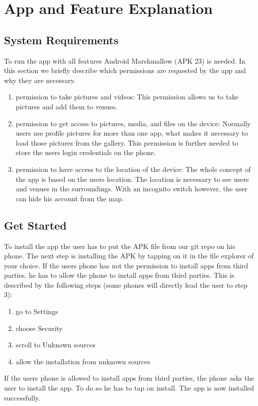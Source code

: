 \documentclass[11pt, accentcolor=tud1c]{tudreport}
\begin{document}


\chapter{App and Feature Explanation}\label{ch:app_and_feature_explanation}

\section{System Requirements}\label{sec:system_requirements}
To run the app with all features Android Marshmallow (APK 23) is needed. 
In this section we briefly describe which permissions are requested by the app and why they are necessary.
\begin{enumerate}
\item permission to take pictures and videos: This permission allows us to take pictures and add them to venues.
\item permission to get access to pictures, media, and files on the device: Normally users use profile pictures for more than one app, what makes it necessary to load those pictures from the gallery. This permission is further needed to store the users login credentials on the phone.
\item permission to have access to the location of the device: The whole concept of the app is based on the users location. The location is necessary to see users and venues in the surroundings. With an incognito switch however, the user can hide his account from the map.
\end{enumerate}

\section{Get Started}
To install the app the user has to put the APK file from our git repo on his phone. The next step is installing the APK by tapping on it in the file explorer of your choice. If the users phone has not the permission to install apps from third parties, he has to allow the phone to install apps from third parties. This is described by the following steps (some phones will directly lead the user to step 3):
\begin{enumerate}
\item go to Settings
\item choose Security
\item scroll to Unknown sources
\item allow the installation from unknown sources
\end{enumerate} 
If the users phone is allowed to install apps from third parties, the phone asks the user to install the app. To do so he has to tap on install. The app is now installed successfully.
\end{document}
